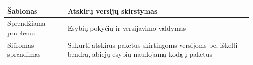\begin{center}
\begin{tabular}{|p{5cm}|p{10cm}|}
        \hline
    \end{tabular}
    \begin{tabular}{|p{5cm}|p{10cm}|}
        \hline
        Šablonas &  Atskirų versijų skirstymas \\ [0.5ex]
        \hline\hline
        Sprendžiama problema & Esybių pokyčių ir versijavimo valdymas\\
        \hline
        Siūlomas sprendimas & Sukurti atskirus paketus skirtingoms versijoms bei iškelti bendrą, abiejų esybių naudojamą kodą į paketus \\
        \hline
    \end{tabular}

\end{center}

